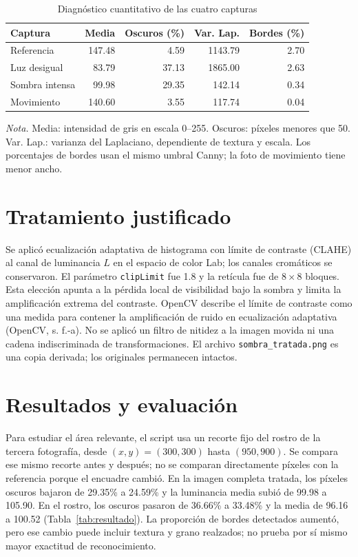 \documentclass[12pt,letterpaper]{article}
\begin{document}
\begin{table}[H]
\caption{Diagnóstico cuantitativo de las cuatro capturas}\label{tab:diagnostico}
\small\begin{tabularx}{\textwidth}{Xrrrr}
\toprule
Captura & Media & Oscuros (\%) & Var. Lap. & Bordes (\%)\\
\midrule
Referencia & 147.48 & 4.59 & 1143.79 & 2.70\\
Luz desigual & 83.79 & 37.13 & 1865.00 & 2.63\\
Sombra intensa & 99.98 & 29.35 & 142.14 & 0.34\\
Movimiento & 140.60 & 3.55 & 117.74 & 0.04\\
\bottomrule
\end{tabularx}\normalsize
\par\noindent\small\textit{Nota.} Media: intensidad de gris en escala 0--255. Oscuros: píxeles menores que 50. Var. Lap.: varianza del Laplaciano, dependiente de textura y escala. Los porcentajes de bordes usan el mismo umbral Canny; la foto de movimiento tiene menor ancho.\normalsize
\end{table}

\section{Tratamiento justificado}
Se aplicó ecualización adaptativa de histograma con límite de contraste (CLAHE) al canal de luminancia $L$ en el espacio de color Lab; los canales cromáticos se conservaron. El parámetro \texttt{clipLimit} fue 1.8 y la retícula fue de $8\times8$ bloques. Esta elección apunta a la pérdida local de visibilidad bajo la sombra y limita la amplificación extrema del contraste. OpenCV describe el límite de contraste como una medida para contener la amplificación de ruido en ecualización adaptativa (OpenCV, s. f.-a). No se aplicó un filtro de nitidez a la imagen movida ni una cadena indiscriminada de transformaciones. El archivo \texttt{sombra\_tratada.png} es una copia derivada; los originales permanecen intactos.

\section{Resultados y evaluación}
Para estudiar el área relevante, el script usa un recorte fijo del rostro de la tercera fotografía, desde $(x,y)=(300,300)$ hasta $(950,900)$. Se compara ese mismo recorte antes y después; no se comparan directamente píxeles con la referencia porque el encuadre cambió. En la imagen completa tratada, los píxeles oscuros bajaron de 29.35\% a 24.59\% y la luminancia media subió de 99.98 a 105.90. En el rostro, los oscuros pasaron de 36.66\% a 33.48\% y la media de 96.16 a 100.52 (Tabla~\ref{tab:resultado}). La proporción de bordes detectados aumentó, pero ese cambio puede incluir textura y grano realzados; no prueba por sí mismo mayor exactitud de reconocimiento.
\end{document}
